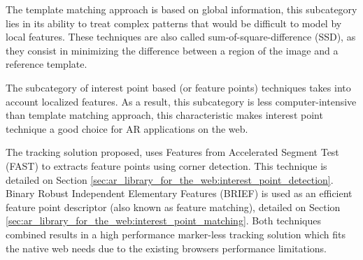 The template matching approach is based on global information, this subcategory lies in its ability to treat complex patterns that would be difficult to model by local features. These techniques are also called sum-of-square-difference (SSD), as they consist in minimizing the difference between a region of the image and a reference template.

The subcategory of interest point based (or feature points) techniques takes into account localized features. As a result, this subcategory is less computer-intensive than template matching approach, this characteristic makes interest point technique a good choice for AR applications on the web.

The tracking solution proposed, uses Features from Accelerated Segment Test (FAST) \cite{Rosten2010} to extracts feature points using corner detection. This technique is detailed on Section \ref{sec:ar_library_for_the_web:interest_point_detection}. Binary Robust Independent Elementary Features (BRIEF) \cite{Calonder2010} is used as an efficient feature point descriptor (also known as feature matching), detailed on Section \ref{sec:ar_library_for_the_web:interest_point_matching}. Both techniques combined results in a high performance marker-less tracking solution which fits the native web needs due to the existing browsers performance limitations.



